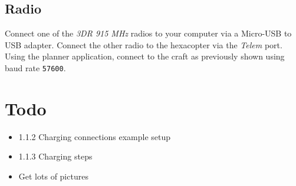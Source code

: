 \documentclass{style}
\begin{document}
\subsection{Radio}
Connect one of the \textit{3DR 915 MHz} radios to your computer via a Micro-USB to USB adapter.
Connect the other radio to the hexacopter via the \textit{Telem} port.  Using the planner application, connect to the craft as previously shown using baud rate \texttt{57600}.
\pagebreak
\section{Todo}
\begin{itemize}
\item 1.1.2 Charging connections example setup
\item 1.1.3 Charging steps
\item Get lots of pictures
\end{itemize}
\end{document}

